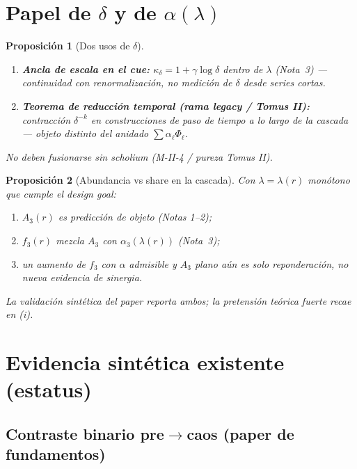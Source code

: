 \documentclass[11pt,a4paper]{article}
\theoremstyle{definition}
\theoremstyle{plain}
\newtheorem{proposition}{Proposici\'on}[section]
\theoremstyle{remark}
\begin{document}
\section{Papel de $\delta$ y de $\alpha(\lambda)$}
\label{sec:delta}

\begin{proposition}[Dos usos de $\delta$]
\label{prop:delta_uses}
\begin{enumerate}[label=(\roman*)]
  \item \textbf{Ancla de escala en el cue:}
  $\kappa_\delta=1+\gamma\log\delta$ dentro de $\lambda$ (Nota~3) ---
  continuidad con renormalización, no medici\'on de $\delta$ desde
  series cortas.
  \item \textbf{Teorema de reducci\'on temporal (rama legacy / Tomus II):}
  contracci\'on $\delta^{-k}$ en construcciones de paso de tiempo a lo
  largo de la cascada --- objeto distinto del anidado
  $\sum\alpha_\ell\Phi_\ell$.
\end{enumerate}
No deben fusionarse sin scholium (M-II-4 / pureza Tomus II).
\end{proposition}

\begin{proposition}[Abundancia vs share en la cascada]
\label{prop:ab_share}
Con $\lambda=\lambda(r)$ mon\'otono que cumple el design goal:
\begin{enumerate}[label=(\roman*)]
  \item $A_3(r)$ es predicci\'on de \emph{objeto} (Notas 1--2);
  \item $f_3(r)$ mezcla $A_3$ con $\alpha_3(\lambda(r))$ (Nota~3);
  \item un aumento de $f_3$ con $\alpha$ admisible y $A_3$ plano a\'un
  es solo reponderaci\'on, no nueva evidencia de sinergia.
\end{enumerate}
La validaci\'on sint\'etica del paper reporta ambos; la pretensi\'on
te\'orica fuerte recae en (i).
\end{proposition}

\section{Evidencia sint\'etica existente (estatus)}
\label{sec:evidence}

\subsection{Contraste binario pre$\to$caos (paper de fundamentos)}
\end{document}
